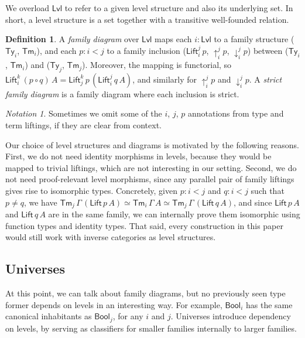 \documentclass[a4paper,UKenglish,cleveref, autoref, thm-restate]{lipics-v2021}
\theoremstyle{remark}
\newtheorem{notation}{Notation}
\theoremstyle{definition}
\newtheorem{mydefinition}{Definition}
\newcommand{\Ty}{\mathsf{Ty}}
\newcommand{\Tm}{\mathsf{Tm}}
\newcommand{\Bool}{\mathsf{Bool}}
\newcommand{\up}{\uparrow}
\newcommand{\down}{\downarrow}
\newcommand{\Lift}{\mathsf{Lift}}
\newcommand{\Lvl}{\mathsf{Lvl}}
\begin{document}
\noindent We overload $\Lvl$ to refer to a given level structure and also its
underlying set. In short, a level structure is a set together with a transitive
well-founded relation.

\begin{mydefinition}
A \emph{family diagram} over $\Lvl$ maps each $i : \Lvl$ to a family structure
($\Ty_i$, $\Tm_i$), and each $p : i < j$ to a family inclusion
($\Lift_{i}^{j}\,p$, $\up_{i}^{j}p$, $\down_{i}^{j}p$) between ($\Ty_i$,
$\Tm_i$) and ($\Ty_j$, $\Tm_j$). Moreover, the mapping is functorial, so
$\Lift_{i}^{k}\,(p\circ q)\,A = \Lift_{j}^{k}\,p\,(\Lift_{i}^{j}\,q\,A)$, and
similarly for $\up_{i}^{j}p$ and $\down_{i}^{j}p$. A \emph{strict family diagram}
is a family diagram where each inclusion is strict.
\end{mydefinition}

\begin{notation}
Sometimes we omit some of the $i$, $j$, $p$ annotations from type and term
liftings, if they are clear from context.
\end{notation}

Our choice of level structures and diagrams is motivated by the following
reasons. First, we do not need identity morphisms in levels, because they would
be mapped to trivial liftings, which are not interesting in our setting. Second,
we do not need proof-relevant level morphisms, since any parallel pair of family
liftings gives rise to isomorphic types. Concretely, given $p : i < j$ and $q :
i < j$ such that $p \neq q$, we have $\Tm_j\,\Gamma\,(\Lift\,p\,A) \simeq
\Tm_i\,\Gamma\,A \simeq \Tm_j\,\Gamma\,(\Lift\,q\,A)$, and since $\Lift\,p\,A$
and $\Lift\,q\,A$ are in the same family, we can internally prove them
isomorphic using function types and identity types. That said, every construction
in this paper would still work with inverse categories as level structures.

\subsection{Universes}
\label{sec:universes}

At this point, we can talk about family diagrams, but no previously seen type
former depends on levels in an interesting way. For example, $\Bool_i$ has the
same canonical inhabitants as $\Bool_j$, for any $i$ and $j$. Universes
introduce dependency on levels, by serving as classifiers for smaller families internally
to larger families.
\end{document}

